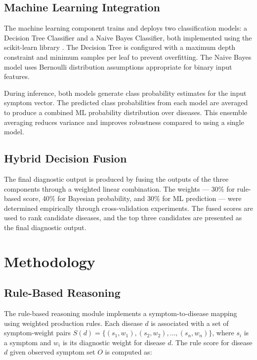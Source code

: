 \documentclass[12pt,a4paper]{article}
\begin{document}
\subsection{Machine Learning Integration}

The machine learning component trains and deploys two classification models: a Decision Tree Classifier and a Naive Bayes Classifier, both implemented using the scikit-learn library \cite{sklearn}. The Decision Tree is configured with a maximum depth constraint and minimum samples per leaf to prevent overfitting. The Naive Bayes model uses Bernoulli distribution assumptions appropriate for binary input features.

During inference, both models generate class probability estimates for the input symptom vector. The predicted class probabilities from each model are averaged to produce a combined ML probability distribution over diseases. This ensemble averaging reduces variance and improves robustness compared to using a single model.

\subsection{Hybrid Decision Fusion}

The final diagnostic output is produced by fusing the outputs of the three components through a weighted linear combination. The weights --- 30\% for rule-based score, 40\% for Bayesian probability, and 30\% for ML prediction --- were determined empirically through cross-validation experiments. The fused scores are used to rank candidate diseases, and the top three candidates are presented as the final diagnostic output.

\section{Methodology}

\subsection{Rule-Based Reasoning}

The rule-based reasoning module implements a symptom-to-disease mapping using weighted production rules. Each disease $d$ is associated with a set of symptom-weight pairs $S(d) = \{(s_1, w_1), (s_2, w_2), \ldots, (s_n, w_n)\}$, where $s_i$ is a symptom and $w_i$ is its diagnostic weight for disease $d$. The rule score for disease $d$ given observed symptom set $O$ is computed as:
\end{document}
